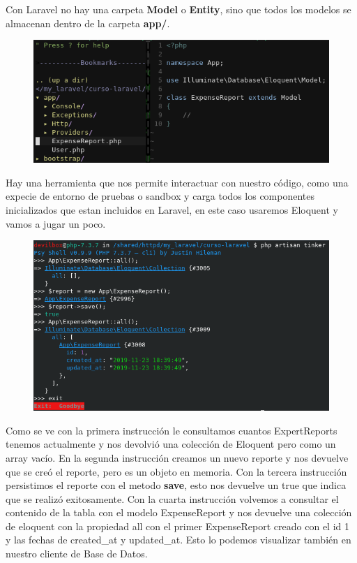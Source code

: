 \documentclass{article}
\begin{document}
Con Laravel no hay una carpeta \textbf{Model} o \textbf{Entity}, sino que todos
los modelos se almacenan dentro de la carpeta \textbf{app/}.

\begin{figure}[h!]
  \centering
  \includegraphics[scale=0.5]{./Pictures/039_model_created_tree.png}
\end{figure}

Hay una herramienta que nos permite interactuar con nuestro código, como una
expecie de entorno de pruebas o sandbox y carga todos los componentes
inicializados que estan incluidos en Laravel, en este caso usaremos Eloquent y
vamos a jugar un poco.\\

\begin{figure}[h!]
  \centering
  \includegraphics[scale=0.5]{./Pictures/040_artisan_tinker.png}
\end{figure}

Como se ve con la primera instrucción le consultamos cuantos ExpertReports
tenemos actualmente y nos devolvió una colección de Eloquent pero como un array
vacío. En la segunda instrucción creamos un nuevo reporte y nos devuelve que se
creó el reporte, pero es un objeto en memoria. Con la tercera instrucción
persistimos el reporte con el metodo \textbf{save}, esto nos devuelve un true
que indica que se realizó exitosamente. Con la cuarta instrucción volvemos a
consultar el contenido de la tabla con el modelo ExpenseReport y nos devuelve
una colección de eloquent con la propiedad all con el primer ExpenseReport
creado con el id 1 y las fechas de created\_at y updated\_at. Esto lo podemos
visualizar también en nuestro cliente de Base de Datos.\\
\end{document}
